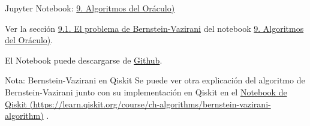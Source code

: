 \documentclass[a4paper,11pt]{book} %
\numberwithin{equation}{chapter}
\begin{document}
	\begin{mybox_orange}{Jupyter Notebook: \href{https://www.scbi.uma.es/web/wp-content/uploads/Jupyterbook/CICC_UMA/Notebooks/html/docs/Part_01/Chapter_09-Busqueda_Oracula_myst.html}{9. Algoritmos del Oráculo)}}
	
	Ver la sección \href{https://www.scbi.uma.es/web/wp-content/uploads/Jupyterbook/CICC_UMA/Notebooks/html/docs/Part_01/Chapter_09-Busqueda_Oracula_myst.html#el-problema-de-bernstein-vazirani}{9.1. El problema de Bernstein-Vazirani} del notebook \href{https://www.scbi.uma.es/web/wp-content/uploads/Jupyterbook/CICC_UMA/Notebooks/html/docs/Part_01/Chapter_09-Busqueda_Oracula_myst.html}{9. Algoritmos del Oráculo)}.
	
	El Notebook puede descargarse de \href{https://github.com/davidcb98/CICC_UMA/blob/master/Notebooks/Part_01/Chapter_09-Busqueda_Oracula.ipynb}{Github}.	
	\end{mybox_orange}





	\begin{mybox_blue}{Nota: Bernstein-Vazirani en Qiskit}
	Se puede ver otra explicación del algoritmo de  Bernstein-Vazirani junto con su implementación en Qiskit en el \href{https://learn.qiskit.org/course/ch-algorithms/bernstein-vazirani-algorithm}{Notebook de Qiskit (https://learn.qiskit.org/course/ch-algorithms/bernstein-vazirani-algorithm)} .
	
	\end{mybox_blue}
	
\end{document}
